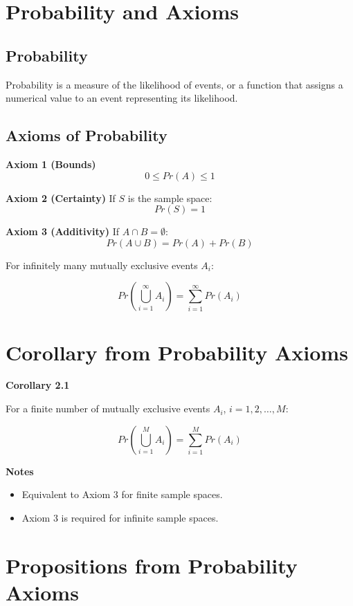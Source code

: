 \documentclass[12pt]{article}
\begin{document}

\section{Probability and Axioms}

\subsection{Probability}
Probability is a measure of the likelihood of events, or a function that assigns a numerical value to an event representing its likelihood.

\subsection{Axioms of Probability}

\textbf{Axiom 1 (Bounds)}
\[
0 \leq Pr(A) \leq 1
\]

\textbf{Axiom 2 (Certainty)}
If $S$ is the sample space:
\[
Pr(S) = 1
\]

\textbf{Axiom 3 (Additivity)}
If $A \cap B = \emptyset$:
\[
Pr(A \cup B) = Pr(A) + Pr(B)
\]

For infinitely many mutually exclusive events $A_i$:

\[
Pr\left(\bigcup_{i=1}^{\infty} A_i\right) =
\sum_{i=1}^{\infty} Pr(A_i)
\]


\section{Corollary from Probability Axioms}

\textbf{Corollary 2.1}

For a finite number of mutually exclusive events $A_i$, $i=1,2,\dots,M$:

\[
Pr\left(\bigcup_{i=1}^{M} A_i\right)
= \sum_{i=1}^{M} Pr(A_i)
\]

\textbf{Notes}
\begin{itemize}
\item Equivalent to Axiom 3 for finite sample spaces.
\item Axiom 3 is required for infinite sample spaces.
\end{itemize}


\section{Propositions from Probability Axioms}
\end{document}
